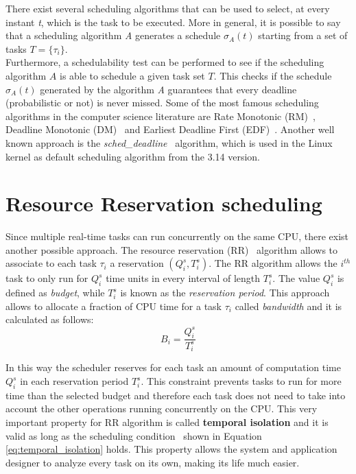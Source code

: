 There exist several scheduling algorithms that can be used to select, at every
instant \emph{t}, which is the task to be executed. More in general, it is
possible to say that a scheduling algorithm \emph{A} generates a schedule
\( \sigma_{A}\left(t\right) \) starting from a set of tasks \( T = \{\tau_{i}\} \).\\
Furthermore, a schedulability test can be performed to see if the scheduling
algorithm \( A \) is able to schedule a given task set \( T \). This checks
if the schedule \( \sigma_{A}\left(t\right) \) generated by the algorithm \emph{A}
guarantees that every deadline (probabilistic or not) is never missed.
Some of the most famous scheduling algorithms in the computer science literature
are Rate Monotonic (RM)~\cite{lehoczky1989rate}, Deadline Monotonic
(DM)~\cite{audsley1991hard} and Earliest Deadline First (EDF)~\cite{jansen2003lightweight}.
Another well known approach is the \emph{sched\_deadline}~\cite{lelli2016deadline}
algorithm, which is used in the Linux kernel as default scheduling algorithm from
the 3.14 version.


\section{Resource Reservation scheduling}
Since multiple real-time tasks can run concurrently on the same CPU, there
exist another possible approach. The resource reservation 
(RR)~\cite{abeni1998integrating} algorithm allows to associate to each task 
\( \tau_{i} \) a reservation \( \left(Q_{i}^s, T_{i}^s\right) \). 
The RR algorithm allows the \( i^{th} \) task to only run for \( Q_{i}^s \) time units 
in every interval of length \( T_{i}^s \). The value \( Q_{i}^s \) is defined as
\emph{budget}, while \( T_{i}^s \) is known as the \emph{reservation period}.
This approach allows to allocate a fraction of CPU time for a task \( \tau_{i} \)
called \emph{bandwidth} and it is calculated as follows:
\begin{equation}
    B_{i} = \frac{Q_{i}^s}{T_{i}^s}
\end{equation}

In this way the scheduler reserves for each task an amount of computation
time \( Q_{i}^s \) in each reservation period \( T_{i}^s \). This constraint
prevents tasks to run for more time than the selected budget and
therefore each task does not need to take into account the other operations running
concurrently on the CPU. This very important property for RR algorithm is called
\textbf{temporal isolation} and it is valid as long as the scheduling
condition~\cite{lee2007handbook} shown in Equation \ref{eq:temporal_isolation} 
holds. This property allows the system and application designer to analyze every
task on its own, making its life much easier.

